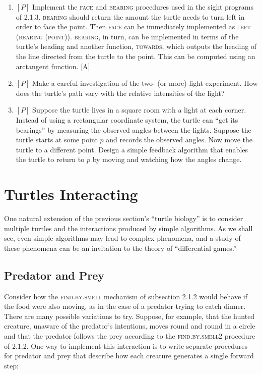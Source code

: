 \documentclass{book}
\begin{document}
\begin{enumerate}
\item $[P]$ Implement the \textsc{face} and \textsc{bearing} procedures used in the sight
programs of 2.1.3. \textsc{bearing} should return the amount the turtle needs to
turn left in order to face the point. Then \textsc{face} can be immediately implemented as \textsc{left (bearing (point))}. \textsc{bearing}, in turn, can be implemented in terms of the turtle's heading and another function, \textsc{towards},
which outputs the heading of the line directed from the turtle to the
point. This can be computed using an arctangent function. [A]
\item $[P]$ Make a careful investigation of the two- (or more) light experiment. How does the turtle's path vary with the relative intensities of
the light?
\item $[P]$ Suppose the turtle lives in a square room with a light at each
corner. Instead of using a rectangular coordinate system, the turtle can
``get its bearings'' by measuring the observed angles between the lights.
Suppose the turtle starts at some point $p$ and records the observed
angles. Now move the turtle to a different point. Design a simple
feedback algorithm that enables the turtle to return to $p$ by moving
and watching how the angles change.
\end{enumerate}

\section {Turtles Interacting}

One natural extension of the previous section's ``turtle biology'' is to
consider multiple turtles and the interactions produced by simple algorithms. As we shall see, even simple algorithms may lead to complex
phenomena, and a study of these phenomena can be an invitation to the
theory of ``differential games.''

\subsection{Predator and Prey}

Consider how the \textsc{find.by.smell} mechanism of subsection 2.1.2 would
behave if the food were also moving, as in the case of a predator trying
to catch dinner. There are many possible variations to try. Suppose, for
example, that the hunted creature, unaware of the predator's intentions,
moves round and round in a circle and that the predator follows the
prey according to the \textsc{find.by.smell2} procedure of 2.1.2. One way to
implement this interaction is to write separate procedures for predator
and prey that describe how each creature generates a single forward
step:
\end{document}
